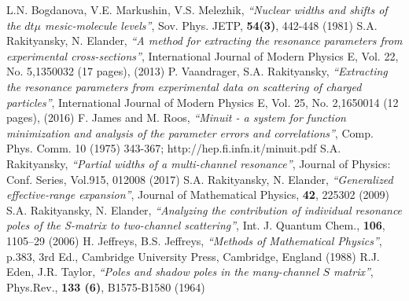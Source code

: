 \documentclass[12pt]{article}
\begin{document}
\begin{thebibliography}{99}
      L.N. Bogdanova, V.E. Markushin, V.S. Melezhik,
      {\it ``Nuclear widths and shifts of the $dt\mu$ mesic-molecule levels''},
      Sov. Phys. JETP, {\bf 54(3)}, 442-448 (1981)
      S.A. Rakityansky, N. Elander,
        {\it ``A method for extracting the resonance
        parameters from experimental cross-sections''},
        International Journal of Modern Physics E,
        Vol. 22, No. 5,1350032 (17 pages), (2013)
        P. Vaandrager, S.A. Rakityansky,
        {\it ``Extracting the resonance parameters from experimental
         data on scattering of charged particles''},
         International Journal of Modern Physics E,
        Vol. 25, No. 2,1650014 (12 pages), (2016)
        F. James and M. Roos,
        {\it``Minuit - a system for function minimization and analysis of the
         parameter errors and correlations''},
        Comp. Phys. Comm. 10 (1975) 343-367; http://hep.fi.infn.it/minuit.pdf
        S.A. Rakityansky,
        {\it``Partial widths of a multi-channel resonance''},
        Journal of Physics: Conf. Series, Vol.915, 012008 (2017)
      S.A. Rakityansky, N. Elander,
        {\it ``Generalized effective-range expansion''},
        Journal of Mathematical Physics, {\bf 42}, 225302 (2009)
        S.A. Rakityansky, N. Elander,
        {\it ``Analyzing the contribution of individual resonance poles of the
         S-matrix to two-channel scattering''},
        Int. J. Quantum Chem., {\bf 106}, 1105–29 (2006)
        H. Jeffreys, B.S. Jeffreys,
        {\it``Methods of Mathematical Physics''},
        p.383, 3rd Ed., Cambridge University Press, Cambridge, England (1988)
        R.J. Eden, J.R. Taylor,
       {\it``Poles and shadow poles in the many-channel $S$ matrix''},
       Phys.Rev., {\bf 133 (6)}, B1575-B1580 (1964)

\end{thebibliography}
\end{document}
